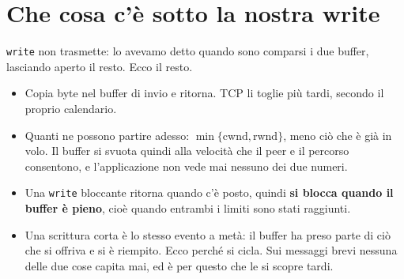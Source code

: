 
\section{Che cosa c'è sotto la nostra write}

\texttt{write} non trasmette: lo avevamo detto quando sono comparsi i due buffer, lasciando aperto il resto. Ecco il
resto.
\begin{itemize}
    \item Copia byte nel buffer di invio e ritorna. TCP li toglie più tardi, secondo il proprio calendario.
    \item Quanti ne possono partire adesso: $\min\{\text{cwnd}, \text{rwnd}\}$, meno ciò che è già in volo. Il buffer si
          svuota quindi alla velocità che il peer e il percorso consentono, e l'applicazione non vede mai nessuno dei due
          numeri.
    \item Una \texttt{write} bloccante ritorna quando c'è posto, quindi \textbf{si blocca quando il buffer è pieno}, cioè
          quando entrambi i limiti sono stati raggiunti.
    \item Una scrittura corta è lo stesso evento a metà: il buffer ha preso parte di ciò che si offriva e si è riempito. Ecco
          perché si cicla. Sui messaggi brevi nessuna delle due cose capita mai, ed è per questo che le si scopre tardi.
\end{itemize}

